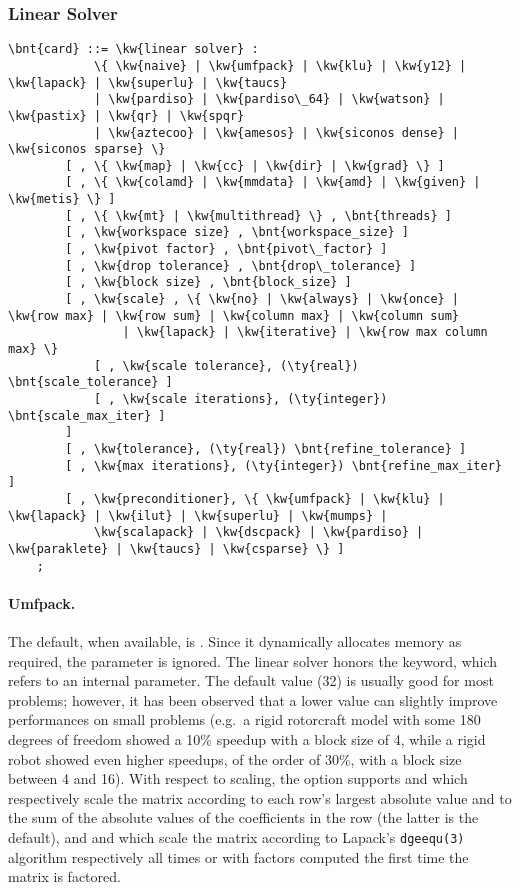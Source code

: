 \subsubsection{Linear Solver}   
\label{sec:LINEAR-SOLVER}
\begin{Verbatim}[commandchars=\\\{\}]
    \bnt{card} ::= \kw{linear solver} :
            \{ \kw{naive} | \kw{umfpack} | \kw{klu} | \kw{y12} | \kw{lapack} | \kw{superlu} | \kw{taucs} 
            | \kw{pardiso} | \kw{pardiso\_64} | \kw{watson} | \kw{pastix} | \kw{qr} | \kw{spqr}
            | \kw{aztecoo} | \kw{amesos} | \kw{siconos dense} | \kw{siconos sparse} \}
        [ , \{ \kw{map} | \kw{cc} | \kw{dir} | \kw{grad} \} ]
        [ , \{ \kw{colamd} | \kw{mmdata} | \kw{amd} | \kw{given} | \kw{metis} \} ]
        [ , \{ \kw{mt} | \kw{multithread} \} , \bnt{threads} ]
        [ , \kw{workspace size} , \bnt{workspace_size} ] 
        [ , \kw{pivot factor} , \bnt{pivot\_factor} ]
        [ , \kw{drop tolerance} , \bnt{drop\_tolerance} ]
        [ , \kw{block size} , \bnt{block_size} ]
        [ , \kw{scale} , \{ \kw{no} | \kw{always} | \kw{once} | \kw{row max} | \kw{row sum} | \kw{column max} | \kw{column sum}
                | \kw{lapack} | \kw{iterative} | \kw{row max column max} \}
            [ , \kw{scale tolerance}, (\ty{real}) \bnt{scale_tolerance} ]
            [ , \kw{scale iterations}, (\ty{integer}) \bnt{scale_max_iter} ]
        ]
        [ , \kw{tolerance}, (\ty{real}) \bnt{refine_tolerance} ]
        [ , \kw{max iterations}, (\ty{integer}) \bnt{refine_max_iter} ]
        [ , \kw{preconditioner}, \{ \kw{umfpack} | \kw{klu} | \kw{lapack} | \kw{ilut} | \kw{superlu} | \kw{mumps} | 
            \kw{scalapack} | \kw{dscpack} | \kw{pardiso} | \kw{paraklete} | \kw{taucs} | \kw{csparse} \} ]
    ;
\end{Verbatim}

\paragraph{Umfpack.}
The default, when available, is .
Since it dynamically allocates memory as required, the  
parameter is ignored.
The  linear solver honors the  keyword,
which refers to an internal parameter.
The default value (32) is usually good for most problems; however,
it has been observed that a lower value can slightly improve
performances on small problems (e.g.\ a rigid rotorcraft model
with some 180 degrees of freedom showed a 10\% speedup with 
a block size of 4, while a rigid robot showed even higher speedups,
of the order of 30\%, with a block size between 4 and 16).
With respect to scaling, the  option supports  and 
which respectively scale the matrix according to each row's
largest absolute value and to the sum of the absolute values
of the coefficients in the row (the latter is the default),
and  and  which scale the matrix
according to Lapack's \texttt{dgeequ(3)} algorithm
respectively all times or with factors computed the first time
the matrix is factored.

